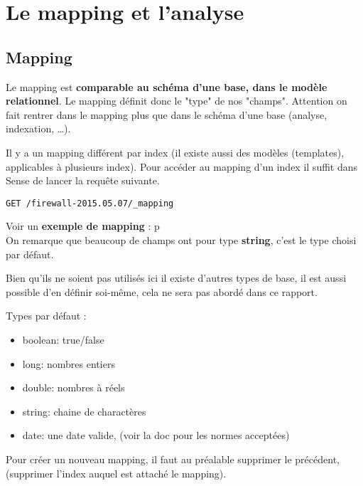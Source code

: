 {\section{Le mapping et l'analyse}
\label{sec:mappingetanalys}
\subsection{Mapping}
Le mapping est \textbf{comparable au schéma d'une base, dans le modèle relationnel}.
Le mapping définit donc le "type" de nos "champs". Attention on fait rentrer dans 
le mapping plus que dans le schéma d'une base (analyse, indexation, \ldots).

Il y a un mapping différent par index (il existe aussi des modèles (templates), 
applicables à plusieurs index). Pour accéder au mapping d'un index il suffit dans 
Sense de lancer la requête suivante.

\begin{lstlisting}[style=code,label={lst:mappingget1},caption={Obtenir un mapping}]
GET /firewall-2015.05.07/_mapping
\end{lstlisting}

Voir un \textbf{exemple de mapping} : p\pageref{lst:mappingresult}\\[2mm]



On remarque que beaucoup de champs ont pour type \textbf{string}, c'est le type choisi
par défaut.

Bien qu'ils ne soient pas utilisés ici il existe d'autres types de base, il est aussi
possible d'en définir soi-même, cela ne sera pas abordé dans ce rapport.

Types par défaut :
\begin{itemize}
    \item   boolean: true/false
    \item   long: nombres entiers
    \item   double: nombres à réels
    \item   string: chaine de charactères
    \item   date:   une date valide, (voir la doc pour les normes acceptées)
\end{itemize}

Pour créer un nouveau mapping, il faut au préalable supprimer le précédent, (supprimer 
l'index auquel est attaché le mapping).


}
